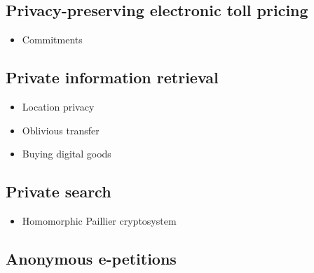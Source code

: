 \documentclass[../overview.tex]{subfiles}
\begin{document}
\subsection{Privacy-preserving electronic toll pricing}
\begin{itemize}
	\item Commitments
\end{itemize}

\subsection{Private information retrieval}
\begin{itemize}
	\item Location privacy
	\item Oblivious transfer
	\item Buying digital goods
\end{itemize}

\subsection{Private search}
\begin{itemize}
	\item Homomorphic Paillier cryptosystem
\end{itemize}


\subsection{Anonymous e-petitions}
\end{document}
